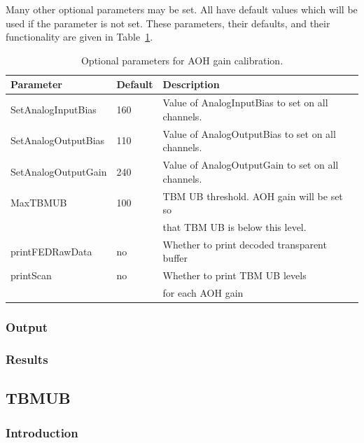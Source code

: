 Many other optional parameters may be set.  All have default values which will be used if the parameter is not set.  These parameters, their defaults, and their functionality are given in Table~\ref{tab:AOHGainParameters}.

\begin{table}
\centering
\caption{Optional parameters for AOH gain calibration.}
\label{tab:AOHGainParameters}
\begin{tabular}{l@{~~~~}l@{~~~~}l}
\hline
\hline
Parameter & Default & Description \\
\hline
SetAnalogInputBias   & 160                & Value of AnalogInputBias to set on all channels. \\
SetAnalogOutputBias  & 110                & Value of AnalogOutputBias to set on all channels. \\
SetAnalogOutputGain  & 240                & Value of AnalogOutputGain to set on all channels. \\
MaxTBMUB             & 100                & TBM UB threshold.  AOH gain will be set so \\
                     &                    & that TBM UB is below this level. \\
printFEDRawData      & no                 & Whether to print decoded transparent buffer \\
printScan            & no                 & Whether to print TBM UB levels \\
                     &                    & for each AOH gain \\
\hline
\hline
\end{tabular}
\end{table}

\subsubsection{Output}
\subsubsection{Results}

\subsection{TBMUB}
\label{sec:TBMUB}

\subsubsection{Introduction}

